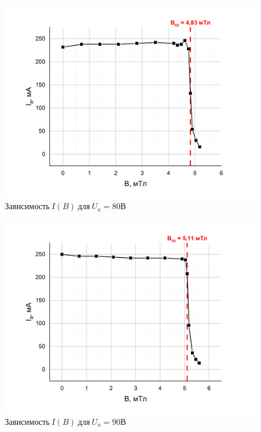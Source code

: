 \documentclass[a4paper,12pt]{article}
\begin{document}
\begin{figure}[h!]
	\begin{center}
	\includegraphics[scale=0.5]{graph4}
	\end{center}
	\caption{$Зависимость \ I(B) \ для \ U_a = 80В$}
	\end{figure}

\begin{figure}[h!]
	\begin{center}
	\includegraphics[scale=0.5]{graph5}
	\end{center}
	\caption{$Зависимость \ I(B) \ для \ U_a = 90В$}
	\end{figure}

\newpage
\end{document}

